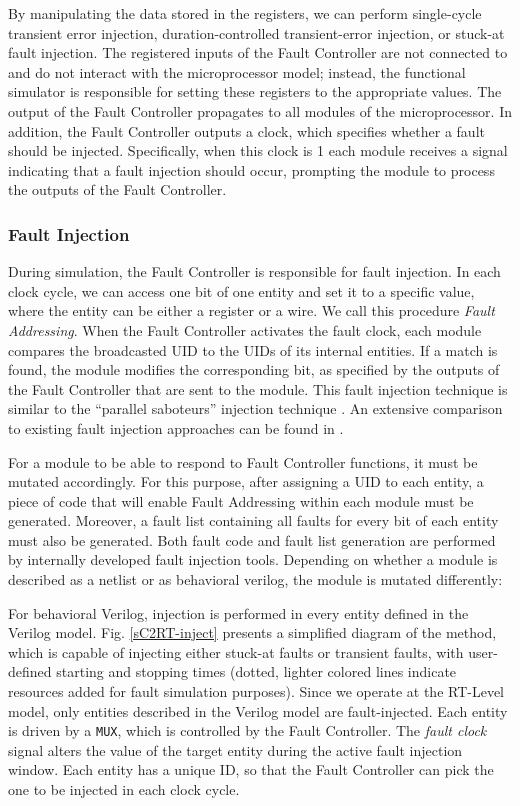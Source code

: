 \documentclass[12pt]{yalephd}
\begin{document}
By manipulating the data stored in the registers, we can perform single-cycle transient error injection, duration-controlled transient-error injection, or stuck-at fault injection. The registered inputs of the Fault Controller are not connected to and do not interact with the microprocessor model; instead, the functional simulator is responsible for setting these registers to the appropriate values. The output of the Fault Controller propagates to all modules of the microprocessor. In addition, the Fault Controller outputs a clock, which specifies whether a fault should be injected. Specifically, when this clock is 1 each module receives a signal indicating that a fault injection should occur, prompting the module to process the outputs of the Fault Controller.

\subsubsection{Fault Injection}\label{sC2Fault_Inj}

During simulation, the Fault Controller is responsible for fault injection. In each clock cycle, we can access one bit of one entity and set it to a specific value, where the entity can be either a register or a wire. We call this procedure {\em Fault Addressing}. When the Fault Controller activates the fault clock, each module compares the broadcasted UID to the UIDs of its internal entities. If a match is found, the module modifies the corresponding bit, as specified by the outputs of the Fault Controller that are sent to the module. This fault injection technique is similar to the ``parallel saboteurs'' injection technique \cite{JAROK94}. An extensive comparison to existing fault injection approaches can be found in \cite{BGBGG08}.

For a module to be able to respond to Fault Controller functions, it must be mutated accordingly. For this purpose, after assigning a UID to each entity, a piece of code that will enable Fault Addressing within each module must be generated. Moreover, a fault list containing all faults for every bit of each entity must also be generated. Both fault code and fault list generation are performed by internally developed fault injection tools. Depending on whether a module is described as a netlist or as behavioral verilog, the module is mutated differently:

 For behavioral Verilog, injection is performed in every entity defined in the Verilog model. Fig. \ref{sC2RT-inject} presents a simplified diagram of the method, which is capable of injecting either stuck-at faults or transient faults, with user-defined starting and stopping times (dotted, lighter colored lines indicate resources added for fault simulation purposes). Since we operate at the RT-Level model, only entities described in the Verilog model are fault-injected. Each entity is driven by a \texttt{MUX}, which is controlled by the Fault Controller. The {\em fault clock} signal alters the value of the target entity during the active fault injection window. Each entity has a unique ID, so that the Fault Controller can pick the one to be injected in each clock cycle.%
\end{document}

